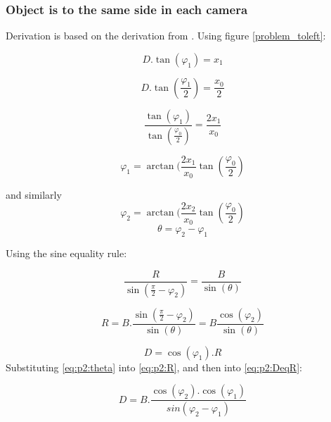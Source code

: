 \subsubsection{Object is to the same side in each camera}
Derivation is based on the derivation from \cite{DistanceEstimation}. Using figure \ref{problem_toleft}:

\begin{equation} \label{eq:p2:tanphi1}
D.\tan(\varphi_{1}) = x_{1}
\end{equation}

\begin{equation} \label{eq:p2:tanphi0}
D.\tan(\frac{\varphi_{1}}{2}) = \frac{x_{0}}{2}
\end{equation}

\begin{equation} \label{eq:p2:tanphi0and1}
\frac{\tan(\varphi_{1})}{\tan(\frac{\varphi_0}{2})} = \frac{2x_1}{x_0}
\end{equation}

\begin{equation} \label{eq:p2:phi1}
\varphi_1 = \arctan(\frac{2x_1}{x_0}\tan(\frac{\varphi_0}{2})
\end{equation}

and similarly
\begin{equation} \label{eq:p2:phi2}
\varphi_2 = \arctan(\frac{2x_2}{x_0}\tan(\frac{\varphi_0}{2})
\end{equation}
\begin{equation} \label{eq:p2:theta}
\theta = \varphi_2 - \varphi_1
\end{equation}

Using the sine equality rule:

\begin{equation} \label{eq:p2:sineeq}
\frac{R}{\sin(\frac{\pi}{2} - \varphi_2)} = \frac{B}{\sin(\theta)}
\end{equation}

\begin{equation} \label{eq:p2:R}
R = B.\frac{\sin(\frac{\pi}{2} - \varphi_2)}{\sin(\theta)} = B \frac{\cos(\varphi_2)}{\sin(\theta)}
\end{equation}

\begin{equation} \label{eq:p2:DeqR}
D = \cos(\varphi_1).R
\end{equation}
Substituting \eqref{eq:p2:theta} into \eqref{eq:p2:R}, and then into \eqref{eq:p2:DeqR}:

\begin{equation} \label{eq:p2:DeqB}
D = B.\frac{\cos(\varphi_2).\cos(\varphi_1)}{sin(\varphi_2 - \varphi_1)}
\end{equation}

